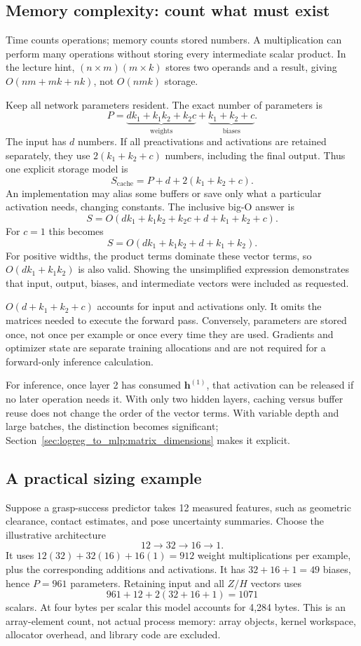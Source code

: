\subsection{Memory complexity: count what must exist}
Time counts operations; memory counts stored numbers. A multiplication can perform many operations without storing every intermediate scalar product. In the lecture hint, $(n\times m)(m\times k)$ stores two operands and a result, giving $O(nm+mk+nk)$, not $O(nmk)$ storage.

Keep all network parameters resident. The exact number of parameters is
\[
 P=\underbrace{dk_1+k_1k_2+k_2c}_{\text{weights}}
  +\underbrace{k_1+k_2+c}_{\text{biases}}.
\]
The input has $d$ numbers. If all preactivations and activations are retained separately, they use $2(k_1+k_2+c)$ numbers, including the final output. Thus one explicit storage model is
\[
 S_{\mathrm{cache}}=P+d+2(k_1+k_2+c).
\]
An implementation may alias some buffers or save only what a particular activation needs, changing constants. The inclusive big-O answer is
\[
 \boxed{S=O(dk_1+k_1k_2+k_2c+d+k_1+k_2+c).}
\]
For $c=1$ this becomes
\[
 \boxed{S=O(dk_1+k_1k_2+d+k_1+k_2)}.
\]
For positive widths, the product terms dominate these vector terms, so $O(dk_1+k_1k_2)$ is also valid. Showing the unsimplified expression demonstrates that input, output, biases, and intermediate vectors were included as requested.

\begin{warning}
$O(d+k_1+k_2+c)$ accounts for input and activations only. It omits the matrices needed to execute the forward pass. Conversely, parameters are stored once, not once per example or once every time they are used. Gradients and optimizer state are separate training allocations and are not required for a forward-only inference calculation.
\end{warning}

For inference, once layer 2 has consumed $\mathbf{h}^{(1)}$, that activation can be released if no later operation needs it. With only two hidden layers, caching versus buffer reuse does not change the order of the vector terms. With variable depth and large batches, the distinction becomes significant; Section~\ref{sec:logreg_to_mlp:matrix_dimensions} makes it explicit.

\subsection{A practical sizing example}
Suppose a grasp-success predictor takes 12 measured features, such as geometric clearance, contact estimates, and pose uncertainty summaries. Choose the illustrative architecture
\[
 12\longrightarrow32\longrightarrow16\longrightarrow1.
\]
It uses $12(32)+32(16)+16(1)=912$ weight multiplications per example, plus the corresponding additions and activations. It has $32+16+1=49$ biases, hence $P=961$ parameters. Retaining input and all $Z/H$ vectors uses
\[
 961+12+2(32+16+1)=1071
\]
scalars. At four bytes per scalar this model accounts for 4,284 bytes. This is an array-element count, not actual process memory: array objects, kernel workspace, allocator overhead, and library code are excluded.

